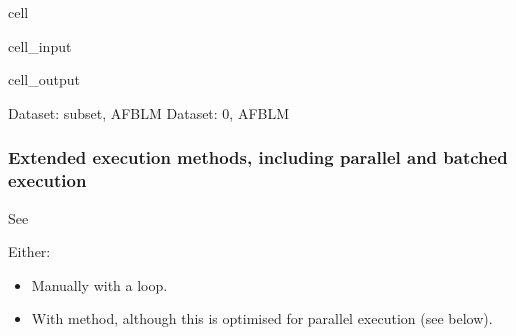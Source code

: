 \documentclass[letterpaper,table,10pt,english]{jupyterBook}
\begin{document}
\begin{sphinxuseclass}{cell}\begin{sphinxVerbatimInput}

\begin{sphinxuseclass}{cell_input}
\begin{sphinxVerbatim}[commandchars=\\\{\}]
\end{sphinxVerbatim}

\end{sphinxuseclass}\end{sphinxVerbatimInput}
\begin{sphinxVerbatimOutput}

\begin{sphinxuseclass}{cell_output}
\begin{sphinxVerbatim}[commandchars=\\\{\}]
Dataset: subset, AFBLM
Dataset: 0, AFBLM
\end{sphinxVerbatim}

\noindent{}

\end{sphinxuseclass}\end{sphinxVerbatimOutput}

\end{sphinxuseclass}

\subsubsection{Extended execution methods, including parallel and batched execution}
\label{\detokenize{part2/basic_fitting_numerics_intro_260423:extended-execution-methods-including-parallel-and-batched-execution}}
\sphinxAtStartPar
See 

\sphinxAtStartPar
{}

\sphinxAtStartPar
Either:
\begin{itemize}
\item {} 
\sphinxAtStartPar
Manually with a loop.

\item {} 
\sphinxAtStartPar
With  method, although this is optimised for parallel execution (see below).

\end{itemize}
\end{document}
